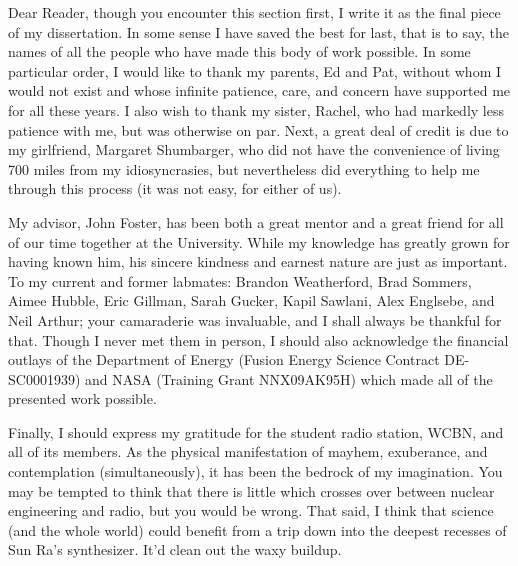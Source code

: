 Dear Reader, though you encounter this section first, I write it as the final
piece of my dissertation. In some sense I have saved the best for last, that is
to say, the names of all the people who have made this body of work possible. In
some particular order, I would like to thank my parents, Ed and Pat, without
whom I would not exist and whose infinite patience, care, and concern have
supported me for all these years. I also wish to thank my sister, Rachel, who
had markedly less patience with me, but was otherwise on par. Next, a great deal
of credit is due to my girlfriend, Margaret Shumbarger, who did not have the
convenience of living 700 miles from my idiosyncrasies, but nevertheless did
everything to help me through this process (it was not easy, for either of us).

My advisor, John Foster, has been both a great mentor and a great friend for all
of our time together at the University. While my knowledge has greatly
grown for having known him, his sincere kindness and earnest nature are just as
important. To my current and former labmates: Brandon Weatherford, Brad
Sommers, Aimee Hubble, Eric Gillman, Sarah Gucker, Kapil Sawlani, Alex Englsebe,
and Neil Arthur; your camaraderie was invaluable, and I shall always be thankful
for that. Though I never met them in person, I should also acknowledge the
financial outlays of the Department of Energy (Fusion Energy Science Contract
DE-SC0001939) and NASA (Training Grant NNX09AK95H) which made all of the
presented work possible.

Finally, I should express my gratitude for the student radio station, WCBN, and
all of its members. As the physical manifestation of mayhem, exuberance, and
contemplation (simultaneously), it has been the bedrock of my imagination. You
may be tempted to think that there is little which crosses over between nuclear
engineering and radio, but you would be wrong. That said, I think that science
(and the whole world) could benefit from a trip down into the deepest recesses
of Sun Ra's synthesizer. It'd clean out the waxy buildup.
